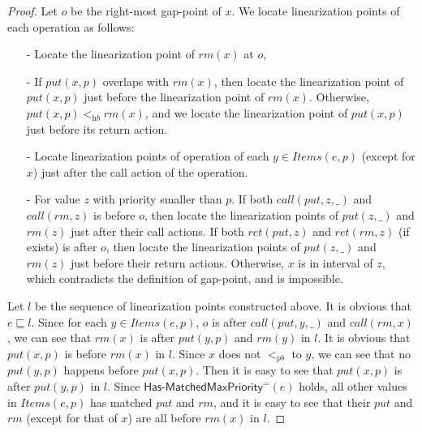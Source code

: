 \begin {proof}

Let $o$ be the right-most gap-point of $x$. We locate linearization points of each operation as follows:

\begin{itemize}
\setlength{\itemsep}{0.5pt}
\item[-] Locate the linearization point of $\textit{rm}(x)$ at $o$,

\item[-] If $\textit{put}(x,p)$ overlaps with $\textit{rm}(x)$, then locate the linearization point of $\textit{put}(x,p)$ just before the linearization point of $\textit{rm}(x)$. Otherwise, $\textit{put}(x,p) <_{\textit{hb}} \textit{rm}(x)$, and we locate the linearization point of $\textit{put}(x,p)$ just before its return action.

\item[-] Locate linearization points of operation of each $y \in \textit{Items}(e,p)$ (except for $x$) just after the call action of the operation.

\item[-] For value $z$ with priority smaller than $p$. If both $\textit{call}(\textit{put},z,\_)$ and $\textit{call}(\textit{rm},z)$ is before $o$, then locate the linearization points of $\textit{put}(z,\_)$ and $\textit{rm}(z)$ just after their call actions. If both $\textit{ret}(\textit{put},z)$ and $\textit{ret}(\textit{rm},z)$ (if exists) is after $o$, then locate the linearization points of $\textit{put}(z,\_)$ and $\textit{rm}(z)$ just before their return actions. Otherwise, $x$ is in interval of $z$, which contradicts the definition of gap-point, and is impossible.
\end{itemize}

Let $l$ be the sequence of linearization points constructed above. It is obvious that $e \sqsubseteq l$. Since for each $y \in \textit{Items}(e,p)$, $o$ is after $\textit{call}(\textit{put},y,\_)$ and $\textit{call}(\textit{rm},x)$, we can see that $\textit{rm}(x)$ is after $\textit{put}(y,p)$ and $\textit{rm}(y)$ in $l$. It is obvious that $\textit{put}(x,p)$ is before $\textit{rm}(x)$ in $l$. Since $x$ does not $<_{\textit{pb}}$ to $y$, we can see that no $\textit{put}(y,p)$ happens before $\textit{put}(x,p)$. Then it is easy to see that $\textit{put}(x,p)$ is after $\textit{put}(y,p)$ in $l$. Since $\mathsf{Has\text{-}MatchedMaxPriority}^{=}(e)$ holds, all other values in $\textit{Items}(e,p)$ has matched $\textit{put}$ and $\textit{rm}$, and it is easy to see that their $\textit{put}$ and $\textit{rm}$ (except for that of $x$) are all before $\textit{rm}(x)$ in $l$.


\end{proof}
